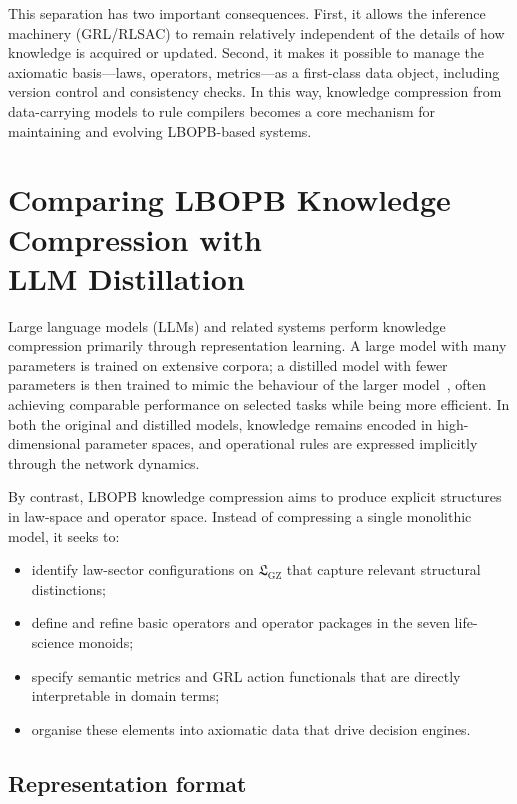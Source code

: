 \documentclass[11pt]{book}
\theoremstyle{plain}
\theoremstyle{definition}
\theoremstyle{remark}
\newcommand{\GZLS}{\ensuremath{\mathfrak{L}_{\mathrm{GZ}}}}       \newcommand{\GZLT}{\ensuremath{M_{!w}}}                           \newcommand{\GZLOC}{\ensuremath{A_M}}                             \newcommand{\GZLCurv}{\ensuremath{\mathcal{F}_{\mathrm{law}}}}
\begin{document}
This separation has two important consequences. First, it allows the
inference machinery (GRL/RLSAC) to remain relatively independent of
the details of how knowledge is acquired or updated. Second, it makes
it possible to manage the axiomatic basis—laws, operators, metrics—as
a first-class data object, including version control and consistency
checks. In this way, knowledge compression from data-carrying models
to rule compilers becomes a core mechanism for maintaining and
evolving LBOPB-based systems.

\section[Comparing LBOPB Knowledge Compression with LLM Distillation]{Comparing LBOPB Knowledge Compression with \\LLM Distillation}


Large language models (LLMs) and related systems perform knowledge
compression primarily through representation learning. A large model
with many parameters is trained on extensive corpora; a distilled
model with fewer parameters is then trained to mimic the behaviour of
the larger model~\cite{Hinton2015Distillation}, often achieving
comparable performance on selected tasks while being more efficient. In both the original and distilled
models, knowledge remains encoded in high-dimensional parameter spaces,
and operational rules are expressed implicitly through the network
dynamics.

By contrast, LBOPB knowledge compression aims to produce explicit
structures in law-space and operator space. Instead of compressing a
single monolithic model, it seeks to:

\begin{itemize}
  \item identify law-sector configurations on $\GZLS$ that capture
        relevant structural distinctions;
  \item define and refine basic operators and operator packages in the
        seven life-science monoids;
  \item specify semantic metrics and GRL action functionals that are
        directly interpretable in domain terms;
  \item organise these elements into axiomatic data that drive
        decision engines.
\end{itemize}

\subsection*{Representation format}
\end{document}
